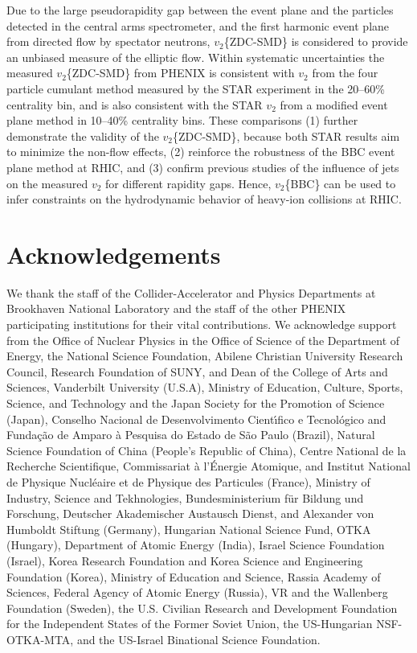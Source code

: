 \documentclass[aps,prc,superscriptaddress,showpacs,floatfix,twocolumn]{revtex4}
\begin{document}
Due to the large pseudorapidity gap between the event plane and 
the particles detected in the central arms spectrometer, and the 
first harmonic event plane from directed flow by spectator 
neutrons, $v_2$\{ZDC-SMD\} is considered to provide an unbiased 
measure of the elliptic flow.  Within systematic uncertainties 
the measured $v_2$\{ZDC-SMD\} from PHENIX is consistent with 
$v_2$ from the four particle cumulant method measured by the 
STAR experiment in the 20--60\% centrality bin, and is also 
consistent with the STAR $v_2$ from a modified event plane 
method in 10--40\% centrality bins.  These comparisons (1) 
further demonstrate the validity of the $v_2$\{ZDC-SMD\}, 
because both STAR results aim to minimize the non-flow effects, 
(2) reinforce the robustness of the BBC event plane method at 
RHIC, and (3) confirm previous studies of the influence of jets 
on the measured $v_2$ for different rapidity gaps.  Hence, 
$v_2$\{BBC\} can be used to infer constraints on the 
hydrodynamic behavior of heavy-ion collisions at RHIC.

\section*{Acknowledgements}  


We thank the staff of the Collider-Accelerator and Physics
Departments at Brookhaven National Laboratory and the staff of
the other PHENIX participating institutions for their vital
contributions.  We acknowledge support from the 
Office of Nuclear Physics in the
Office of Science of the Department of Energy, the
National Science Foundation, Abilene Christian University
Research Council, Research Foundation of SUNY, and Dean of the
College of Arts and Sciences, Vanderbilt University (U.S.A),
Ministry of Education, Culture, Sports, Science, and Technology
and the Japan Society for the Promotion of Science (Japan),
Conselho Nacional de Desenvolvimento Cient\'{\i}fico e
Tecnol{\'o}gico and Funda\c c{\~a}o de Amparo {\`a} Pesquisa do
Estado de S{\~a}o Paulo (Brazil),
Natural Science Foundation of China (People's Republic of China),
Centre National de la Recherche Scientifique, Commissariat
{\`a} l'{\'E}nergie Atomique, and Institut National de Physique
Nucl{\'e}aire et de Physique des Particules (France),
Ministry of Industry, Science and Tekhnologies,
Bundesministerium f\"ur Bildung und Forschung, Deutscher
Akademischer Austausch Dienst, 
and Alexander von Humboldt Stiftung (Germany),
Hungarian National Science Fund, OTKA (Hungary), 
Department of Atomic Energy (India), 
Israel Science Foundation (Israel), 
Korea Research Foundation 
and Korea Science and Engineering Foundation (Korea),
Ministry of Education and Science, Rassia Academy of Sciences,
Federal Agency of Atomic Energy (Russia),
VR and the Wallenberg Foundation (Sweden), 
the U.S. Civilian Research and Development Foundation for the
Independent States of the Former Soviet Union, the US-Hungarian
NSF-OTKA-MTA, and the US-Israel Binational Science Foundation.
\end{document}
